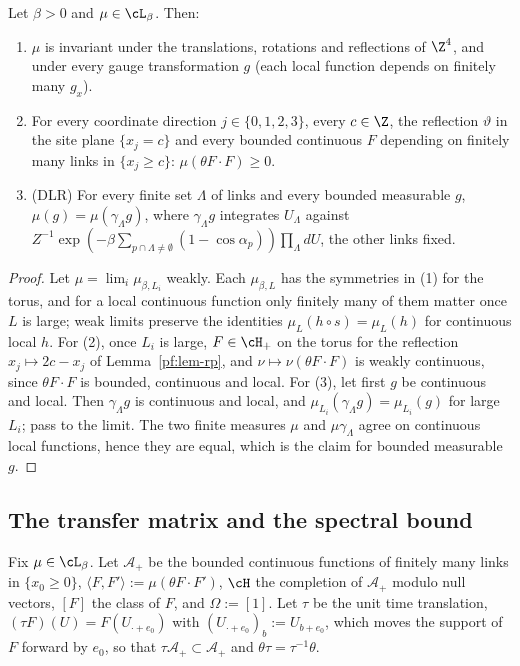 \begin{lemma}\label{pf:lem-limit}
Let $\beta>0$ and $\mu\in\cL_\beta$. Then:
\begin{enumerate}
\item $\mu$ is invariant under the translations, rotations and reflections of $\Z^4$, and under every gauge transformation $g$ (each local function depends on finitely many $g_x$).
\item For every coordinate direction $j\in\{0,1,2,3\}$, every $c\in\Z$, the reflection $\vartheta$ in the site plane $\{x_j=c\}$ and every bounded continuous $F$ depending on finitely many links in $\{x_j\ge c\}$: $\mu(\theta F\cdot F)\ge0$.
\item (DLR) For every finite set $\Lambda$ of links and every bounded measurable $g$, $\mu(g)=\mu(\gamma_\Lambda g)$, where $\gamma_\Lambda g$ integrates $U_\Lambda$ against $Z^{-1}\exp(-\beta\sum_{p\cap\Lambda\ne\emptyset}(1-\cos\alpha_p))\prod_\Lambda dU$, the other links fixed.
\end{enumerate}
\end{lemma}

\begin{proof}
Let $\mu=\lim_i\mu_{\beta,L_i}$ weakly. Each $\mu_{\beta,L}$ has the symmetries in (1) for the torus, and for a local continuous function only finitely many of them matter once $L$ is large; weak limits preserve the identities $\mu_L(h\circ s)=\mu_L(h)$ for continuous local $h$. For (2), once $L_i$ is large, $F\in\cH_+$ on the torus for the reflection $x_j\mapsto2c-x_j$ of Lemma~\ref{pf:lem-rp}, and $\nu\mapsto\nu(\theta F\cdot F)$ is weakly continuous, since $\theta F\cdot F$ is bounded, continuous and local. For (3), let first $g$ be continuous and local. Then $\gamma_\Lambda g$ is continuous and local, and $\mu_{L_i}(\gamma_\Lambda g)=\mu_{L_i}(g)$ for large $L_i$; pass to the limit. The two finite measures $\mu$ and $\mu\gamma_\Lambda$ agree on continuous local functions, hence they are equal, which is the claim for bounded measurable $g$.
\end{proof}

\subsection{The transfer matrix and the spectral bound}\label{pf:sec-transfer}

Fix $\mu\in\cL_\beta$. Let $\mathcal A_+$ be the bounded continuous functions of finitely many links in $\{x_0\ge0\}$, $\langle F,F'\rangle:=\mu(\theta F\cdot F')$, $\cH$ the completion of $\mathcal A_+$ modulo null vectors, $[F]$ the class of $F$, and $\Omega:=[1]$. Let $\tau$ be the unit time translation, $(\tau F)(U)=F(U_{\cdot+e_0})$ with $(U_{\cdot+e_0})_b:=U_{b+e_0}$, which moves the support of $F$ forward by $e_0$, so that $\tau\mathcal A_+\subset\mathcal A_+$ and $\theta\tau=\tau^{-1}\theta$.

